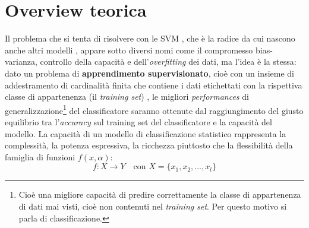 \section{Overview teorica}
Il problema che si tenta di risolvere con le \ac{SVM} , che è la radice da cui nascono anche altri modelli , appare sotto diversi nomi come il compromesso bias-varianza, controllo della capacità e dell'\textit{overfitting} dei dati, ma l'idea è la stessa: dato un problema di \textbf{apprendimento supervisionato}, cioè con un insieme di addestramento di cardinalità finita che contiene i dati etichettati con la rispettiva classe di appartenenza (il \textit{training set}) , le migliori \textit{performances} di generalizzazione\footnote{Cioè una migliore capacità di predire correttamente la classe di appartenenza di dati mai visti, cioè non contenuti nel \textit{training set}. Per questo motivo si parla di classificazione.} del classificatore saranno ottenute dal raggiungimento del giusto equilibrio tra l'\textit{accuracy} sul training set del classificatore e la capacità del modello. La capacità di un modello di classificazione statistico rappresenta la complessità, la potenza espressiva, la ricchezza piuttosto che la flessibilità della famiglia di funzioni $f(x,\alpha)$:
\begin{equation*}
\label{eq:effe}
f : X \to Y \quad \text{con } X=\{x_{1},x_{2},\dots,x_{l}\} 
\end{equation*}
